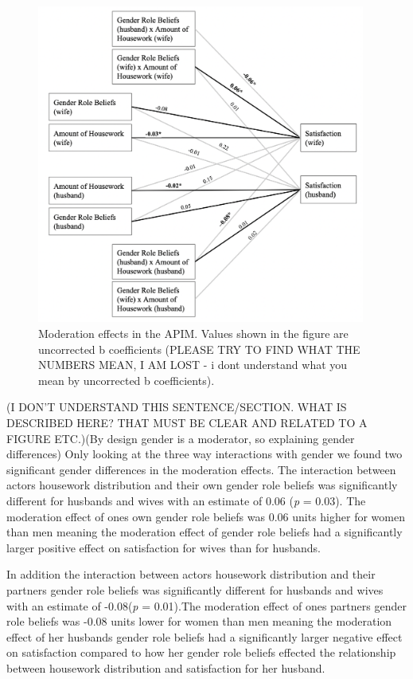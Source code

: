 \documentclass[
  man,floatsintext]{apa6}
\begin{document}
\begin{figure}
\includegraphics[width=4.25in]{moderation} \caption{Moderation effects in the APIM. Values shown in the figure are uncorrected b coefficients (PLEASE TRY TO FIND WHAT THE NUMBERS MEAN, I AM LOST - i dont understand what you mean by uncorrected b coefficients).}\label{fig:unnamed-chunk-9}
\end{figure}

(I DON'T UNDERSTAND THIS SENTENCE/SECTION. WHAT IS DESCRIBED HERE? THAT MUST BE CLEAR AND RELATED TO A FIGURE ETC.)(By design gender is a moderator, so explaining gender differences) Only looking at the three way interactions with gender we found two significant gender differences in the moderation effects. The interaction between actors housework distribution and their own gender role beliefs was significantly different for husbands and wives with an estimate of 0.06 (\emph{p} = 0.03). The moderation effect of ones own gender role beliefs was 0.06 units higher for women than men meaning the moderation effect of gender role beliefs had a significantly larger positive effect on satisfaction for wives than for husbands.

In addition the interaction between actors housework distribution and their partners gender role beliefs was significantly different for husbands and wives with an estimate of -0.08(\emph{p} = 0.01).The moderation effect of ones partners gender role beliefs was -0.08 units lower for women than men meaning the moderation effect of her husbands gender role beliefs had a significantly larger negative effect on satisfaction compared to how her gender role beliefs effected the relationship between housework distribution and satisfaction for her husband.
\end{document}
